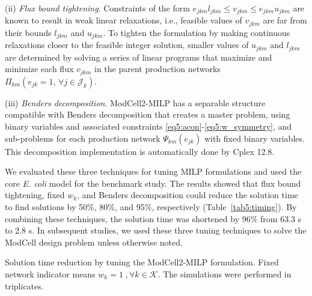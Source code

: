 (ii) \textit{Flux bound tightening}. Constraints of the form $ e_{jkm} l_{jkm} \le v_{jkm} \le e_{jkm} u_{jkm}$ are known to result in weak linear relaxations, i.e., feasible values of $v_{jkm}$ are far from their bounds $l_{jkm}$ and $u_{jkm}$. To tighten the formulation by making continuous relaxations closer to the feasible integer solution, smaller values of $u_{jkm}$ and $l_{jkm}$ are determined by solving a series of linear programs that maximize and minimize each flux $v_{jkm}$ in the parent production networks $\Pi_{km}(e_{jk}=1, \, \forall j \in \mathcal{J}_k)$.

(iii) \textit{Benders decomposition}. ModCell2-MILP has a separable structure compatible with Benders decomposition\citep{geoffrion1972, fischetti2016} that creates a  master problem, using binary variables and associated constraints \eqref{eq5:acon}-\eqref{eq5:w_symmetry}, and sub-problems for each production network $\Psi_{km}(e_{jk})$ with fixed binary variables. This decomposition implementation is automatically done by Cplex 12.8.

We evaluated these three techniques for tuning MILP formulations and used the core\textit{ E. coli} model\citep{garcia2019} for the benchmark study. The results showed that flux bound tightening, fixed $w_k$, and Benders decomposition could reduce the solution time to find solutions by 50\%, 80\%, and  95\%, respectively (Table~\ref{tab5:timing}). By combining these techniques, the solution time was shortened by 96\% from 63.3 s to 2.8 s. In subsequent studies, we used these three tuning techniques to solve the ModCell design problem unless otherwise noted.

\begin{table}[ht]
    \caption[Solution time reduction by tuning the ModCell2-MILP formulation]{Solution time reduction by tuning the ModCell2-MILP formulation.
    Fixed network indicator means $w_k = 1\;, \forall k \in \mathcal{K}$. The simulations were performed in triplicates.
    }
    \centering
	
    \label{tab5:timing}
\end{table}

